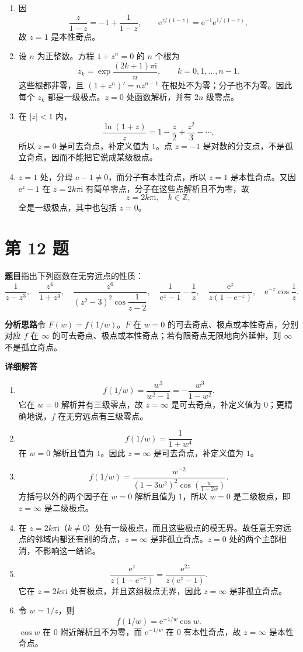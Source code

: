 \documentclass[UTF8,11pt,a4paper,fontset=fandol]{ctexart}
\newcommand{\ii}{\mathrm{i}}
\newcommand{\ee}{\mathrm{e}}
\newcommand{\idea}{\par\medskip\Needspace{3\baselineskip}\noindent\textbf{分析思路}\quad}
\newcommand{\answer}{\par\medskip\Needspace{3\baselineskip}\noindent\textbf{详细解答}\quad}
\newcommand{\problem}[1]{\par\Needspace{8\baselineskip}\section*{第 #1 题}\addcontentsline{toc}{section}{第 #1 题}}
\begin{document}
{\begin{enumerate}
\[\]
主部仍有无穷多项，故 $z=0$ 是本性奇点。
\item 因
\[
\frac z{1-z}=-1+\frac1{1-z},
\qquad
\ee^{z/(1-z)}=\ee^{-1}\ee^{1/(1-z)},
\]
故 $z=1$ 是本性奇点。
\item 设 $n$ 为正整数。方程 $1+z^n=0$ 的 $n$ 个根为
\[
z_k=\exp\frac{(2k+1)\pi\ii}{n},\qquad k=0,1,\ldots,n-1.
\]
这些根都非零，且 $(1+z^n)'=nz^{n-1}$ 在根处不为零；分子也不为零。因此每个 $z_k$ 都是一级极点。$z=0$ 处函数解析，并有 $2n$ 级零点。
\item 在 $|z|<1$ 内，
\[
\frac{\ln(1+z)}z
=1-\frac z2+\frac{z^2}3-\cdots,
\]
所以 $z=0$ 是可去奇点，补定义值为 $1$。点 $z=-1$ 是对数的分支点，不是孤立奇点，因而不能把它说成某级极点。
\item $z=1$ 处，分母 $\ee-1\ne0$，而分子有本性奇点，所以 $z=1$ 是本性奇点。又因 $\ee^z-1$ 在 $z=2k\pi\ii$ 有简单零点，分子在这些点解析且不为零，故
\[
z=2k\pi\ii,\quad k\in\mathbb Z,
\]
全是一级极点，其中也包括 $z=0$。
\end{enumerate}

\problem{12}
\textbf{题目}\quad 指出下列函数在无穷远点的性质：
\[
\frac1{z-z^3},\quad \frac{z^4}{1+z^4},\quad
\frac{z^6}{(z^2-3)^2\cos\dfrac1{z-2}},\quad
\frac1{\ee^z-1}-\frac1z,\quad
\frac{\ee^z}{z(1-\ee^{-z})},\quad
\ee^{-z}\cos\frac1z.
\]
\idea 令 $F(w)=f(1/w)$。$F$ 在 $w=0$ 的可去奇点、极点或本性奇点，分别对应 $f$ 在 $\infty$ 的可去奇点、极点或本性奇点；若有限奇点无限地向外延伸，则 $\infty$ 不是孤立奇点。
\answer
\begin{enumerate}
\item
\[
f(1/w)=\frac{w^3}{w^2-1}=-\frac{w^3}{1-w^2}.
\]
它在 $w=0$ 解析并有三级零点，故 $z=\infty$ 是可去奇点，补定义值为 $0$；更精确地说，$f$ 在无穷远点有三级零点。
\item
\[
f(1/w)=\frac1{1+w^4}
\]
在 $w=0$ 解析且值为 $1$。因此 $z=\infty$ 是可去奇点，补定义值为 $1$。
\item
\[
f(1/w)=
\frac{w^{-2}}{(1-3w^2)^2\cos\!\left(\frac{w}{1-2w}\right)}.
\]
方括号以外的两个因子在 $w=0$ 解析且值为 $1$，所以 $w=0$ 是二级极点，即 $z=\infty$ 是二级极点。
\item 在 $z=2k\pi\ii$（$k\ne0$）处有一级极点，而且这些极点的模无界。故任意无穷远点的邻域内都还有别的奇点，$z=\infty$ 是非孤立奇点。$z=0$ 处的两个主部相消，不影响这一结论。
\item
\[
\frac{\ee^z}{z(1-\ee^{-z})}=\frac{\ee^{2z}}{z(\ee^z-1)}.
\]
它在 $z=2k\pi\ii$ 处有极点，并且这组极点无界，因此 $z=\infty$ 是非孤立奇点。
\item 令 $w=1/z$，则
\[
f(1/w)=\ee^{-1/w}\cos w.
\]
$\cos w$ 在 $0$ 附近解析且不为零，而 $\ee^{-1/w}$ 在 $0$ 有本性奇点，故 $z=\infty$ 是本性奇点。
\end{enumerate}

}
\end{document}
